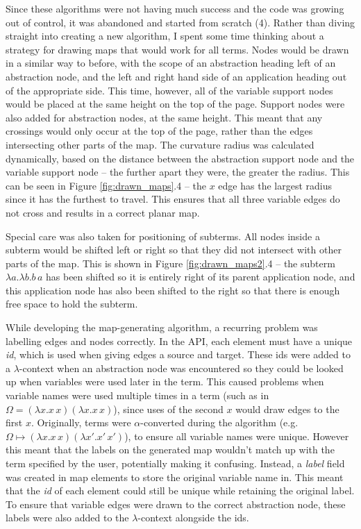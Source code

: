 \documentclass[11pt]{article}
\begin{document}
Since these algorithms were not having much success and the code was growing out of control, it was abandoned and started from scratch (4). Rather than diving straight into creating a new algorithm, I spent some time thinking about a strategy for drawing maps that would work for all terms. Nodes would be drawn in a similar way to before, with the scope of an abstraction heading left of an abstraction node, and the left and right hand side of an application heading out of the appropriate side. This time, however, all of the variable support nodes would be placed at the same height on the top of the page. Support nodes were also added for abstraction nodes, at the same height. This meant that any crossings would only occur at the top of the page, rather than the edges intersecting other parts of the map. The curvature radius was calculated dynamically, based on the distance between the abstraction support node and the variable support node -- the further apart they were, the greater the radius. This can be seen in Figure \ref{fig:drawn_maps}.4 -- the $x$ edge has the largest radius since it has the furthest to travel. This ensures that all three variable edges do not cross and results in a correct planar map.

Special care was also taken for positioning of subterms. All nodes inside a subterm would be shifted left or right so that they did not intersect with other parts of the map. This is shown in Figure \ref{fig:drawn_maps2}.4 -- the subterm $\lambda a. \lambda b. b \, a$ has been shifted so it is entirely right of its parent application node, and this application node has also been shifted to the right so that there is enough free space to hold the subterm.

While developing the map-generating algorithm, a recurring problem was labelling edges and nodes correctly. In the API, each element must have a unique \textit{id}, which is used when giving edges a source and target. These ids were added to a $\lambda$-context when an abstraction node was encountered so they could be looked up when variables were used later in the term. This caused problems when variable names were used multiple times in a term (such as in $\Omega = (\lambda x. x \, x)(\lambda x. x \, x)$), since uses of the second $x$ would draw edges to the first $x$. Originally, terms were $\alpha$-converted during the algorithm (e.g. $\Omega \mapsto (\lambda x. x \, x)(\lambda x'. x' \, x')$), to ensure all variable names were unique. However this meant that the labels on the generated map wouldn't match up with the term specified by the user, potentially making it confusing. Instead, a \textit{label} field was created in map elements to store the original variable name in. This meant that the \textit{id} of each element could still be unique while retaining the original label. To ensure that variable edges were drawn to the correct abstraction node, these labels were also added to the $\lambda$-context alongside the ids.
\end{document}
